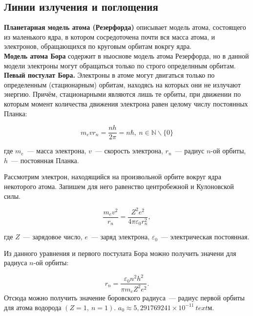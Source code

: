 \subsection{Линии излучения и поглощения}

	\textbf{Планетарная модель атома (Резерфорда)} описывает модель атома, состоящего из маленького ядра, в котором сосредоточена почти вся масса атома, и электронов, обращающихся по круговым орбитам вокргу ядра. \\
	 
	\textbf{Модель атома Бора} содержит в ныоснове модель атома Резерфорда, но в данной модели электроны могут обращаться только по строго определнным орбитам.\\
	
	\textbf{Певый постулат Бора.} Электроны в атоме могут двигаться только по определенным (стационарным) орбитам, находясь на которых они не излучают энергию.  Причём, стационарными являются лишь те орбиты, при движении по которым момент количества движения электрона равен целому числу постоянных Планка:
	
	\begin{equation}
		m_e v r_n = \frac{n h}{2 \pi} = n \hbar,~n \in \mathbb{N} \backslash \lbrace 0 \rbrace
	\end{equation}

	где $m_e$~--- масса электрона, $v$~--- скорость электрона, $r_n$~--- радиус $n$-ой орбиты, $h$~--- постоянная Планка.

	Рассмотрим электрон, находящийся на произвольной орбите вокруг ядра некоторого атома. Запишем для него равенство центробежной и Кулоновской силы.
	
	\begin{equation}
		\frac{m_e v^2}{r_n} = \frac{Z^2 e^2}{4 \pi \varepsilon_0 r_n^2},
	\end{equation}
	
	где $Z$~--- зарядовое число, $e$~--- заряд электрона, $\varepsilon_0$~--- электрическая постоянная.
	
	Из данного уравнения и первого постулата Бора можно получить значени для радиуса $n$-ой орбиты:
	
	\begin{equation}
		r_n = \frac{\varepsilon_0 n^2 h^2}{\pi m_e Z^2 e^2}.
	\end{equation}
	Отсюда можно получить значение боровского радиуса~--- радиус первой орбиты для атома водорода $(Z = 1,~n = 1)$. $a_0 \approx 5,291769241 \times 10^{-11}~text{м}$. \\
	
